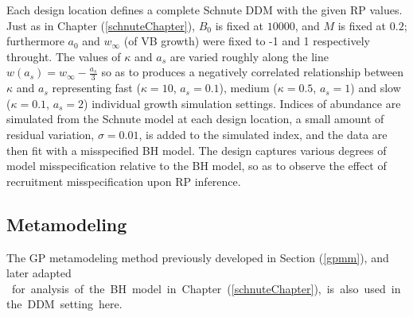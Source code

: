 %
Each design location defines a complete Schnute DDM with
the given RP values. Just as in Chapter (\ref{schnuteChapter}), $B_0$ is fixed 
at $10000$, and $M$ is fixed at $0.2$; furthermore $a_0$ and $w_\infty$ (of VB 
growth) were fixed to -1 and 1 respectively throught.
The values of $\kappa$ and $a_s$ are varied roughly along the line $w(a_s)=w_\infty-\frac{a_s}{3}$ 
so as to produces a negatively correlated relationship between $\kappa$ and 
$a_s$ representing fast ($\kappa=10$,  $a_s=0.1$), medium ($\kappa=0.5$,  $a_s=1$) and 
slow ($\kappa=0.1$,  $a_s=2$) individual growth simulation settings.
Indices of abundance are simulated from the Schnute model at each design 
location, a small amount of residual variation, $\sigma = 0.01$,
is added to the simulated index, and the data are then fit with a misspecified
BH model. The design captures various degrees of model misspecification
relative to the BH model, so as to observe the effect of recruitment
misspecification upon RP inference.

%

%
\subsection{Metamodeling}

%
The GP metamodeling method previously developed in Section (\ref{gpmm}), and later adapted 
\mbox{%
for analysis of the BH model in Chapter (\ref{schnuteChapter}), 
is also used in the DDM setting here.
}


